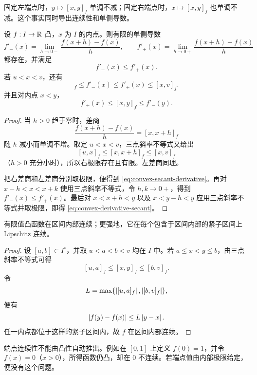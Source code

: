 固定左端点时，\(y\mapsto[x,y]_f\) 单调不减；固定右端点时，\(x\mapsto[x,y]_f\) 也单调不减。这个事实同时导出连续性和单侧导数。

\begin{theorem}[内点处的单侧导数]
\label{thm:convex-one-sided-derivatives}
设 \(f:I\to\mathbb{R}\) 凸，\(x\) 为 \(I\) 的内点。则有限的单侧导数
\[
 f'_-(x)=\lim_{h\to0-}\frac{f(x+h)-f(x)}h,
 \qquad
 f'_+(x)=\lim_{h\to0+}\frac{f(x+h)-f(x)}h
\]
都存在，并满足
\begin{equation}
 f'_-(x)\le f'_+(x).
 \label{eq:convex-one-sided-order}
\end{equation}
若 \(u<x<v\)，还有
\begin{equation}
 [u,x]_f\le f'_-(x)\le f'_+(x)\le[x,v]_f.
 \label{eq:convex-secant-derivative}
\end{equation}
并且对内点 \(x<y\)，
\begin{equation}
 f'_+(x)\le [x,y]_f\le f'_-(y).
 \label{eq:convex-derivative-secant}
\end{equation}
\end{theorem}

\begin{proof}
当 \(h>0\) 趋于零时，差商
\[
 \frac{f(x+h)-f(x)}h=[x,x+h]_f
\]
随 \(h\) 减小而单调不增。取定 \(u<x<v\)，三点斜率不等式又给出
\[
 [u,x]_f\le[x,x+h]_f\le[x,v]_f
\]
（\(h>0\) 充分小时），所以右极限存在且有限。左差商同理。

把右差商和左差商分别取极限，便得到 \eqref{eq:convex-secant-derivative}。再对 \(x-h<x<x+k\) 使用三点斜率不等式，令 \(h,k\to0+\)，得到 \(f'_-(x)\le f'_+(x)\)。最后对 \(x<x+h<y\) 以及 \(x<y-h<y\) 应用三点斜率不等式并取极限，即得 \eqref{eq:convex-derivative-secant}。
\end{proof}

\begin{corollary}[凸函数的内点连续性]
\label{cor:convex-local-lipschitz}
有限值凸函数在区间内部连续；更强地，它在每个包含于区间内部的紧子区间上 Lipschitz 连续。
\end{corollary}

\begin{proof}
设 \([a,b]\subset I^\circ\)，并取 \(u<a<b<v\) 均在 \(I\) 中。若 \(a\le x<y\le b\)，由三点斜率不等式可得
\[
 [u,a]_f\le[x,y]_f\le[b,v]_f.
\]
令
\[
 L=\max\{\left|[u,a]_f\right|,\left|[b,v]_f\right|\},
\]
便有
\[
 \left|f(y)-f(x)\right|\le L\left|y-x\right|.
\]
任一内点都位于这样的紧子区间内，故 \(f\) 在区间内部连续。
\end{proof}

端点连续性不能由凸性自动推出。例如在 \([0,1]\) 上定义 \(f(0)=1\)，并令 \(f(x)=0\)（\(x>0\)），所得函数仍凸，却在 \(0\) 不连续。若端点值由内部极限给定，便没有这个问题。

